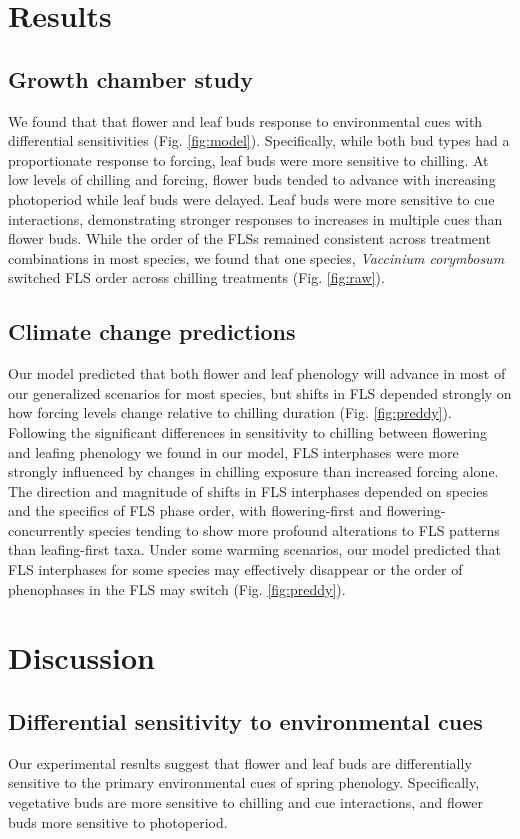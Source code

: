 \documentclass[11pt]{article}
\begin{document}
\section*{Results}
\subsection*{Growth chamber study}
\noindent We found that that flower and leaf buds response to environmental cues with differential sensitivities (Fig. \ref{fig:model}). Specifically, while both bud types had a proportionate response to forcing, leaf buds were more sensitive to chilling. At low levels of chilling and forcing, flower buds tended to advance with increasing photoperiod while leaf buds were delayed. Leaf buds were more sensitive to cue interactions, demonstrating stronger responses to increases in multiple cues than flower buds. While the order of the FLSs remained consistent across treatment combinations in most species, we found that one species, \textit{Vaccinium corymbosum} switched FLS order across chilling treatments (Fig. \ref{fig:raw}). 

\subsection*{Climate change predictions}
\noindent Our model predicted that both flower and leaf phenology will advance in most of our generalized scenarios for most species, but shifts in FLS depended strongly on how forcing levels change relative to chilling duration (Fig. \ref{fig:preddy}). Following the significant differences in sensitivity to chilling between flowering and leafing phenology we found in our model, FLS interphases were more strongly influenced by changes in chilling exposure than increased forcing alone. The direction and magnitude of shifts in FLS interphases depended on species and the specifics of FLS phase order, with flowering-first and flowering-concurrently species tending to show more profound alterations to FLS patterns than leafing-first taxa. Under some warming scenarios, our model predicted that  FLS interphases for some species may effectively disappear or the order of phenophases in the FLS may switch (Fig. \ref{fig:preddy}).

\section*{Discussion}

\subsection*{Differential sensitivity to environmental cues}
\noindent Our experimental results suggest that flower and leaf buds are differentially sensitive to the primary environmental cues of spring phenology. Specifically, vegetative buds are more sensitive to chilling and cue interactions, and flower buds more sensitive to photoperiod.
\end{document}
